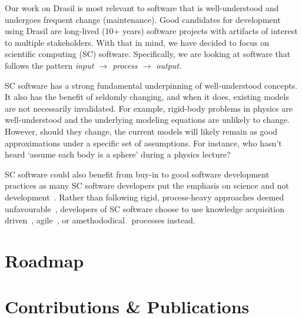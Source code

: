 Our work on Drasil is most relevant to software that is well-understood and 
undergoes frequent change (maintenance). Good candidates for development using
Drasil are long-lived (10+ years) software projects with artifacts of interest
to multiple stakeholders. With that in mind, we have decided to focus on
scientific computing (SC) software. Specifically, we are looking at software 
that follows the pattern \emph{input $\rightarrow$ process $\rightarrow$ 
output}.

SC software has a strong fundamental underpinning of well-understood concepts.
It also has the benefit of seldomly changing, and when it does, existing models
are not necessarily invalidated. For example, rigid-body problems in physics are
well-understood and the underlying modeling equations are unlikely to change.
However, should they change, the current models will likely remain as good
approximations under a specific set of assumptions. For instance, who hasn't
heard `assume each body is a sphere' during a physics lecture?

SC software could also benefit from buy-in to good software development 
practices as many SC software developers put the emphasis on science and not 
development~\citep{Kelly2007}. Rather than following rigid, process-heavy 
approaches deemed unfavourable~\citep{CarverEtAl2007}, developers of SC 
software choose to use knowledge acquisition driven~\citep{Kelly2015}, 
agile~\citep{Segal2005, CarverEtAl2007, AckroydEtAl2008, 
EasterbrookAndJohns2009}, or amethododical~\citep{Kelly2013} processes instead.

\section{Roadmap}


\section{Contributions \& Publications}


